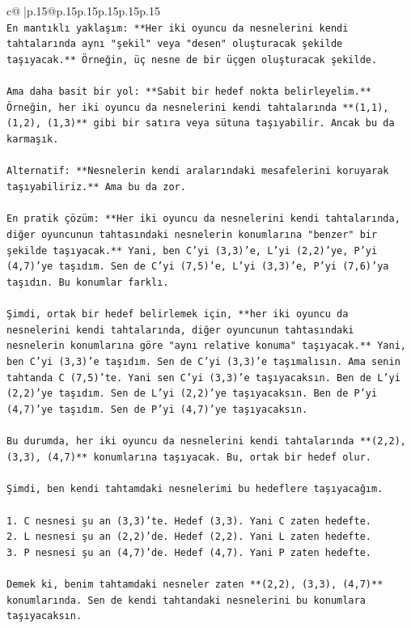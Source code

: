 \documentclass{article}
\begin{document}
{\begin{supertabular}{c@{$\;$}|p{.15\linewidth}@{}p{.15\linewidth}p{.15\linewidth}p{.15\linewidth}p{.15\linewidth}p{.15\linewidth}}
{{{\\ 
\texttt{En mantıklı yaklaşım: **Her iki oyuncu da nesnelerini kendi tahtalarında aynı "şekil" veya "desen" oluşturacak şekilde taşıyacak.** Örneğin, üç nesne de bir üçgen oluşturacak şekilde.} \\
\\ 
\texttt{Ama daha basit bir yol: **Sabit bir hedef nokta belirleyelim.** Örneğin, her iki oyuncu da nesnelerini kendi tahtalarında **(1,1), (1,2), (1,3)** gibi bir satıra veya sütuna taşıyabilir. Ancak bu da karmaşık.} \\
\\ 
\texttt{Alternatif: **Nesnelerin kendi aralarındaki mesafelerini koruyarak taşıyabiliriz.** Ama bu da zor.} \\
\\ 
\texttt{En pratik çözüm: **Her iki oyuncu da nesnelerini kendi tahtalarında, diğer oyuncunun tahtasındaki nesnelerin konumlarına "benzer" bir şekilde taşıyacak.** Yani, ben C'yi (3,3)'e, L'yi (2,2)'ye, P'yi (4,7)'ye taşıdım. Sen de C'yi (7,5)'e, L'yi (3,3)'e, P'yi (7,6)'ya taşıdın. Bu konumlar farklı.} \\
\\ 
\texttt{Şimdi, ortak bir hedef belirlemek için, **her iki oyuncu da nesnelerini kendi tahtalarında, diğer oyuncunun tahtasındaki nesnelerin konumlarına göre "aynı relative konuma" taşıyacak.** Yani, ben C'yi (3,3)'e taşıdım. Sen de C'yi (3,3)'e taşımalısın. Ama senin tahtanda C (7,5)'te. Yani sen C'yi (3,3)'e taşıyacaksın. Ben de L'yi (2,2)'ye taşıdım. Sen de L'yi (2,2)'ye taşıyacaksın. Ben de P'yi (4,7)'ye taşıdım. Sen de P'yi (4,7)'ye taşıyacaksın.} \\
\\ 
\texttt{Bu durumda, her iki oyuncu da nesnelerini kendi tahtalarında **(2,2), (3,3), (4,7)** konumlarına taşıyacak. Bu, ortak bir hedef olur.} \\
\\ 
\texttt{Şimdi, ben kendi tahtamdaki nesnelerimi bu hedeflere taşıyacağım.} \\
\\ 
\texttt{1. C nesnesi şu an (3,3)'te. Hedef (3,3). Yani C zaten hedefte.} \\
\texttt{2. L nesnesi şu an (2,2)'de. Hedef (2,2). Yani L zaten hedefte.} \\
\texttt{3. P nesnesi şu an (4,7)'de. Hedef (4,7). Yani P zaten hedefte.} \\
\\ 
\texttt{Demek ki, benim tahtamdaki nesneler zaten **(2,2), (3,3), (4,7)** konumlarında. Sen de kendi tahtandaki nesnelerini bu konumlara taşıyacaksın.} \\
}}}
\end{supertabular}}
\end{document}

